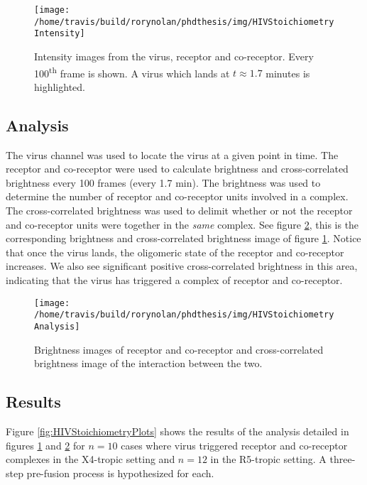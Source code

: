 \documentclass[12pt,]{book}
\theoremstyle{definition}
\theoremstyle{definition}
\theoremstyle{definition}
\theoremstyle{remark}
\begin{document}
\begin{figure}

\texttt{[image: /home/travis/build/rorynolan/phdthesis/img/HIVStoichiometryIntensity]} \hfill{}

\caption{Intensity images from the virus,
receptor and co-receptor. Every 100\textsuperscript{th} frame is shown.
A virus which lands at \(t \approx 1.7\) minutes is highlighted.}\label{fig:HIVStoichiometryIntensity}
\end{figure}

\subsection{Analysis}\label{analysis}

The virus channel was used to locate the virus at a given point in time.
The receptor and co-receptor were used to calculate brightness and
cross-correlated brightness every 100 frames (every 1.7 min). The
brightness was used to determine the number of receptor and co-receptor
units involved in a complex. The cross-correlated brightness was used to
delimit whether or not the receptor and co-receptor units were together
in the \emph{same} complex. See figure
\ref{fig:HIVStoichiometryAnalysis}, this is the corresponding brightness
and cross-correlated brightness image of figure
\ref{fig:HIVStoichiometryIntensity}. Notice that once the virus lands,
the oligomeric state of the receptor and co-receptor increases. We also
see significant positive cross-correlated brightness in this area,
indicating that the virus has triggered a complex of receptor and
co-receptor.





\begin{figure}

\texttt{[image: /home/travis/build/rorynolan/phdthesis/img/HIVStoichiometryAnalysis]} \hfill{}

\caption{Brightness images of receptor and
co-receptor and cross-correlated brightness image of the interaction
between the two.}\label{fig:HIVStoichiometryAnalysis}
\end{figure}

\subsection{Results}\label{results}

Figure \ref{fig:HIVStoichiometryPlots} shows the results of the analysis
detailed in figures \ref{fig:HIVStoichiometryIntensity} and
\ref{fig:HIVStoichiometryAnalysis} for \(n=10\) cases where virus
triggered receptor and co-receptor complexes in the X4-tropic setting
and \(n=12\) in the R5-tropic setting. A three-step pre-fusion process
is hypothesized for each.
\end{document}
